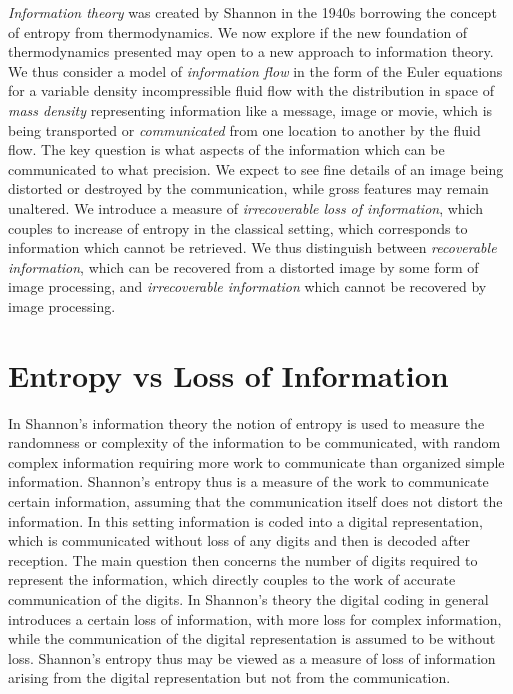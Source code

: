 \emph{Information theory} was created by Shannon \cite{shannon} in 
the 1940s borrowing the concept of 
entropy from thermodynamics. 
We now explore if the new foundation 
of thermodynamics presented may open to a new approach 
to information theory.  
We thus consider a model of \emph{information flow} in the form
of the Euler equations for a variable density incompressible fluid 
flow with the distribution in space of \emph{mass density}  
representing information like a message, image or movie, 
which is being transported 
or \emph{communicated} from one location to another by the fluid flow.
The key question is what aspects of the 
information which can be communicated to what precision. 
We expect to see fine details of an image being 
distorted or destroyed by the communication, while
gross features may remain unaltered. We introduce a measure of 
\emph{irrecoverable loss of information}, which couples to
increase of entropy in the classical setting,
which corresponds to information which cannot be retrieved. 
We thus distinguish between 
\emph{recoverable information}, which can be recovered from a 
distorted image by some form of image processing, and
\emph{irrecoverable information} which cannot be recovered 
by image processing. 

\section{Entropy vs Loss of Information}

In Shannon's information theory the notion of entropy
is used to measure the randomness or complexity
of the information to be communicated, with random
complex information requiring more work to communicate than
organized simple information. Shannon's entropy thus is
a measure of the work to communicate certain information,
assuming that the communication itself does not distort
the information. In this setting information is
coded into a digital representation, which is communicated without loss
of any digits and then is decoded after reception. 
The main question then concerns the number
of digits required to represent the information, which directly couples
to the work of accurate communication of the digits.
In Shannon's theory the digital coding in general introduces a certain 
loss of information, with more loss for complex information,
while the communication of the digital
representation is assumed to be without loss. Shannon's entropy
thus may be viewed as a measure of loss of information arising
from the digital representation but not from the communication. 

